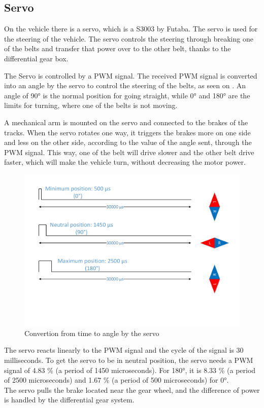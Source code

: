 \subsection{Servo}
On the vehicle there is a servo, which is a S3003 by Futaba.
The servo is used for the steering of the vehicle. The servo controls the steering through breaking one of the belts and transfer that power over to the other belt, thanks to the differential gear box.


The Servo is controlled by a PWM signal. The received PWM signal is converted into an angle by the servo to control the steering of the belts, as seen on . An angle of 90° is the normal position for going straight, while 0° and 180° are the limits for turning, where one of the belts is not moving. 

A mechanical arm is mounted on the servo and connected to the brakes of the tracks. When the servo rotates one way, it triggers the brakes more on one side and less on the other side, according to the value of the angle sent, through the PWM signal. This way, one of the belt will drive slower and the other belt drive faster, which will make the vehicle turn, without decreasing the motor power.




\begin{figure}[H]
	\centering
	\includegraphics[scale=0.6]{figures/TimeVSangle.pdf}
	\caption{Convertion from time to angle by the servo}
	\label{timeVSangle}
\end{figure}

The servo reacts linearly to the PWM signal and the cycle of the signal is 30 milliseconds. To get the servo to be in neutral position, the servo needs a PWM signal of 4.83 \% (a period of 1450 microseconds). For 180°, it is 8.33 \% (a period of 2500 microseconds) and 1.67 \% (a period of 500 microseconds) for 0°. \\


The servo pulls the brake located near the gear wheel, and the difference of power is handled by the differential gear system.